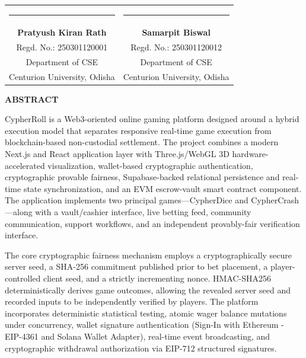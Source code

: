 \vspace{4.0cm}
\noindent
\begin{tabular*}{\textwidth}{@{\extracolsep{\fill}}cc}
    \rule{5.8cm}{0.4pt} & \rule{5.8cm}{0.4pt} \\
    \textbf{Pratyush Kiran Rath} & \textbf{Samarpit Biswal} \\
    Regd. No.: 250301120001 & Regd. No.: 250301120012 \\
    Department of CSE & Department of CSE \\
    Centurion University, Odisha & Centurion University, Odisha
\end{tabular*}

\newpage
\pagestyle{frontmatterstyle}
\thispagestyle{frontmatterstyle}
\begin{center}
    \vspace*{0.5cm}
    {\Large \textbf{ABSTRACT}\par}
    \vspace{0.8cm}
\end{center}

CypherRoll is a Web3-oriented online gaming platform designed around a hybrid execution model that separates responsive real-time game execution from blockchain-based non-custodial settlement. The project combines a modern Next.js and React application layer with Three.js/WebGL 3D hardware-accelerated visualization, wallet-based cryptographic authentication, cryptographic provable fairness, Supabase-backed relational persistence and real-time state synchronization, and an EVM escrow-vault smart contract component. The application implements two principal games---CypherDice and CypherCrash---along with a vault/cashier interface, live betting feed, community communication, support workflows, and an independent provably-fair verification interface.

The core cryptographic fairness mechanism employs a cryptographically secure server seed, a SHA-256 commitment published prior to bet placement, a player-controlled client seed, and a strictly incrementing nonce. HMAC-SHA256 deterministically derives game outcomes, allowing the revealed server seed and recorded inputs to be independently verified by players. The platform incorporates deterministic statistical testing, atomic wager balance mutations under concurrency, wallet signature authentication (Sign-In with Ethereum - EIP-4361 and Solana Wallet Adapter), real-time event broadcasting, and cryptographic withdrawal authorization via EIP-712 structured signatures.

